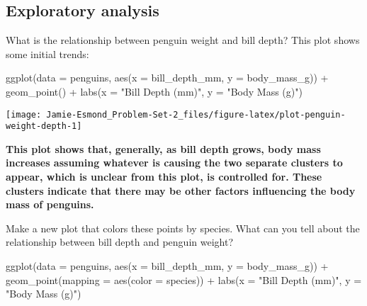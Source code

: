 \documentclass[
]{article}
\newenvironment{Shaded}{\begin{snugshade}}{\end{snugshade}}
\newcommand{\AttributeTok}[1]{\textcolor[rgb]{0.77,0.63,0.00}{#1}}
\newcommand{\FunctionTok}[1]{\textcolor[rgb]{0.00,0.00,0.00}{#1}}
\newcommand{\NormalTok}[1]{#1}
\newcommand{\SpecialCharTok}[1]{\textcolor[rgb]{0.00,0.00,0.00}{#1}}
\newcommand{\StringTok}[1]{\textcolor[rgb]{0.31,0.60,0.02}{#1}}
\begin{document}
\hypertarget{exploratory-analysis}{%
\subsection{Exploratory analysis}\label{exploratory-analysis}}

What is the relationship between penguin weight and bill depth? This
plot shows some initial trends:

\begin{Shaded}
\begin{Highlighting}[]
\FunctionTok{ggplot}\NormalTok{(}\AttributeTok{data =}\NormalTok{ penguins, }
       \FunctionTok{aes}\NormalTok{(}\AttributeTok{x =}\NormalTok{ bill\_depth\_mm, }\AttributeTok{y =}\NormalTok{ body\_mass\_g)) }\SpecialCharTok{+}
  \FunctionTok{geom\_point}\NormalTok{() }\SpecialCharTok{+}
  \FunctionTok{labs}\NormalTok{(}\AttributeTok{x =} \StringTok{"Bill Depth (mm)"}\NormalTok{, }
       \AttributeTok{y =} \StringTok{"Body Mass (g)"}\NormalTok{)}
\end{Highlighting}
\end{Shaded}

\begin{center}\texttt{[image: Jamie-Esmond\_Problem-Set-2\_files/figure-latex/plot-penguin-weight-depth-1]} \end{center}

\textbf{This plot shows that, generally, as bill depth grows, body mass
increases assuming whatever is causing the two separate clusters to
appear, which is unclear from this plot, is controlled for. These
clusters indicate that there may be other factors influencing the body
mass of penguins.}

Make a new plot that colors these points by species. What can you tell
about the relationship between bill depth and penguin weight?

\begin{Shaded}
\begin{Highlighting}[]
\FunctionTok{ggplot}\NormalTok{(}\AttributeTok{data =}\NormalTok{ penguins, }
       \FunctionTok{aes}\NormalTok{(}\AttributeTok{x =}\NormalTok{ bill\_depth\_mm, }\AttributeTok{y =}\NormalTok{ body\_mass\_g)) }\SpecialCharTok{+}
  \FunctionTok{geom\_point}\NormalTok{(}\AttributeTok{mapping =} \FunctionTok{aes}\NormalTok{(}\AttributeTok{color =}\NormalTok{ species)) }\SpecialCharTok{+}
  \FunctionTok{labs}\NormalTok{(}\AttributeTok{x =} \StringTok{"Bill Depth (mm)"}\NormalTok{, }
       \AttributeTok{y =} \StringTok{"Body Mass (g)"}\NormalTok{)}
\end{Highlighting}
\end{Shaded}
\end{document}
